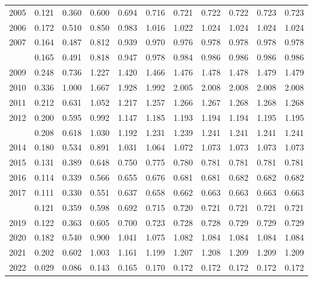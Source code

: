 \documentclass[
]{article}
\begin{document}
\begin{longtable}[t]{lrrrrrrrrrr}
2005 & 0.121 & 0.360 & 0.600 & 0.694 & 0.716 & 0.721 & 0.722 & 0.722 & 0.723 & 0.723\\
2006 & 0.172 & 0.510 & 0.850 & 0.983 & 1.016 & 1.022 & 1.024 & 1.024 & 1.024 & 1.024\\
2007 & 0.164 & 0.487 & 0.812 & 0.939 & 0.970 & 0.976 & 0.978 & 0.978 & 0.978 & 0.978\\
\addlinespace
2008 & 0.165 & 0.491 & 0.818 & 0.947 & 0.978 & 0.984 & 0.986 & 0.986 & 0.986 & 0.986\\
2009 & 0.248 & 0.736 & 1.227 & 1.420 & 1.466 & 1.476 & 1.478 & 1.478 & 1.479 & 1.479\\
2010 & 0.336 & 1.000 & 1.667 & 1.928 & 1.992 & 2.005 & 2.008 & 2.008 & 2.008 & 2.008\\
2011 & 0.212 & 0.631 & 1.052 & 1.217 & 1.257 & 1.266 & 1.267 & 1.268 & 1.268 & 1.268\\
2012 & 0.200 & 0.595 & 0.992 & 1.147 & 1.185 & 1.193 & 1.194 & 1.194 & 1.195 & 1.195\\
\addlinespace
2013 & 0.208 & 0.618 & 1.030 & 1.192 & 1.231 & 1.239 & 1.241 & 1.241 & 1.241 & 1.241\\
2014 & 0.180 & 0.534 & 0.891 & 1.031 & 1.064 & 1.072 & 1.073 & 1.073 & 1.073 & 1.073\\
2015 & 0.131 & 0.389 & 0.648 & 0.750 & 0.775 & 0.780 & 0.781 & 0.781 & 0.781 & 0.781\\
2016 & 0.114 & 0.339 & 0.566 & 0.655 & 0.676 & 0.681 & 0.681 & 0.682 & 0.682 & 0.682\\
2017 & 0.111 & 0.330 & 0.551 & 0.637 & 0.658 & 0.662 & 0.663 & 0.663 & 0.663 & 0.663\\
\addlinespace
2018 & 0.121 & 0.359 & 0.598 & 0.692 & 0.715 & 0.720 & 0.721 & 0.721 & 0.721 & 0.721\\
2019 & 0.122 & 0.363 & 0.605 & 0.700 & 0.723 & 0.728 & 0.728 & 0.729 & 0.729 & 0.729\\
2020 & 0.182 & 0.540 & 0.900 & 1.041 & 1.075 & 1.082 & 1.084 & 1.084 & 1.084 & 1.084\\
2021 & 0.202 & 0.602 & 1.003 & 1.161 & 1.199 & 1.207 & 1.208 & 1.209 & 1.209 & 1.209\\
2022 & 0.029 & 0.086 & 0.143 & 0.165 & 0.170 & 0.172 & 0.172 & 0.172 & 0.172 & 0.172\\*
\end{longtable}
\end{document}

